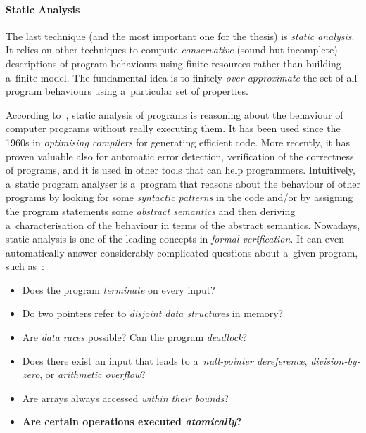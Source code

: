 \paragraph{Static Analysis}
The last technique (and the most important one for the thesis) is \emph{static analysis}. It relies on other techniques to compute \emph{conservative} (sound but incomplete) descriptions of program behaviours using finite resources rather than building a~finite model. The fundamental idea is to finitely \emph{over-approximate} the set of all program behaviours using a~particular set of properties.

According to~\cite{staticAnalysisMoller}, static analysis of programs is reasoning about the behaviour of computer programs without really executing them. It has been used since the 1960s in \emph{optimising compilers} for generating efficient code. More recently, it has proven valuable also for automatic error detection, verification of the correctness of programs, and it is used in other tools that can help programmers. Intuitively, a~static program analyser is a~program that reasons about the behaviour of other programs by looking for some \emph{syntactic patterns} in the code and/or by assigning the program statements some \emph{abstract semantics} and then deriving a~characterisation of the behaviour in terms of the abstract semantics. Nowadays, static analysis is one of the leading concepts in \emph{formal verification}. It can even automatically answer considerably complicated questions about a~given program, such as~\cite{staticAnalysisMoller}:
\begin{itemize}
    \item Does the program \emph{terminate} on every input?    

    \item Do two pointers refer to \emph{disjoint data structures} in memory?
    
    \item Are \emph{data races} possible? Can the program \emph{deadlock}?
    
    \item Does there exist an input that leads to a~\emph{null-pointer dereference}, \emph{division-by-zero}, or \emph{arithmetic overflow}?
    
    \item Are arrays always accessed \emph{within their bounds}?
    
    \item \textbf{Are certain operations executed \emph{atomically}?}
\end{itemize}

